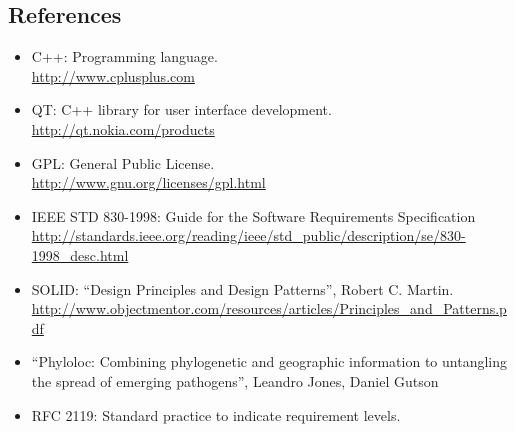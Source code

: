 \documentclass[10pt,a4paper]{article}
\begin{document}
\begin{appendices}
	\section{References}
  \label{appendix-ref}
  \begin{itemize}
    \item C++: Programming language. \\
    \url{http://www.cplusplus.com}
    \item QT: C++ library for user interface development.\\
    \url{http://qt.nokia.com/products}
    \item GPL: General Public License. \\
    \url{http://www.gnu.org/licenses/gpl.html}
    \item IEEE STD 830-1998: Guide for the Software Requirements Specification \\
    \url{http://standards.ieee.org/reading/ieee/std_public/description/se/830-1998_desc.html}
    \item SOLID: ``Design Principles and Design Patterns'', Robert C. Martin. \\
    \url{http://www.objectmentor.com/resources/articles/Principles_and_Patterns.pdf}    
\item ``Phyloloc: Combining phylogenetic and geographic information to
untangling the spread of emerging pathogens'', Leandro Jones, Daniel Gutson
\item RFC 2119: Standard practice to indicate requirement levels.
  \end{itemize}
\end{appendices}
\end{document}

